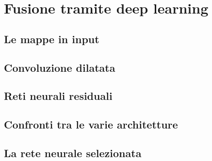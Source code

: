 \chapter{Fusione tramite deep learning}

\section{Le mappe in input}

\section{Convoluzione dilatata}

\section{Reti neurali residuali}

\section{Confronti tra le varie architetture}

\section{La rete neurale selezionata}